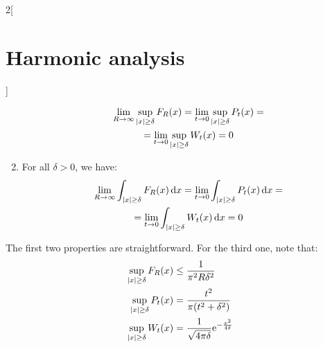 \documentclass[../../../main_math.tex]{subfiles}
\begin{document}
\begin{multicols}{2}[\section{Harmonic analysis}]
\begin{proposition}
\begin{enumerate}
            \begin{multline*}
              \lim_{R\to \infty}\sup_{\abs{x}\geq \delta}F_R(x)=\lim_{t\to 0}\sup_{\abs{x}\geq \delta}P_t(x)=\\=\lim_{t\to 0}\sup_{\abs{x}\geq \delta}W_t(x)=0
            \end{multline*}
            \item\label{HA:propsKernelsitem4} For all $\delta>0$, we have:
            \begin{multline*}
              \lim_{R\to \infty}\int_{\abs{x}\geq \delta}F_R(x)\dd{x}=\lim_{t\to 0}\int_{\abs{x}\geq \delta}P_t(x)\dd{x}=\\=\lim_{t\to 0}\int_{\abs{x}\geq \delta}W_t(x)\dd{x}=0
            \end{multline*}
    \end{enumerate}
  \end{proposition}
  \begin{sproof}
    The first two properties are straightforward. For the third one, note that:
    \begin{align*}
      \sup_{\abs{x}\geq \delta}F_R(x) & \leq \frac{1}{\pi^2 R \delta^2}                        \\
      \sup_{\abs{x}\geq \delta}P_t(x) & =\frac{t^2}{\pi(t^2+\delta^2)}                         \\
      \sup_{\abs{x}\geq \delta}W_t(x) & =\frac{1}{\sqrt{4\pi\delta}}\mathrm{e}^{-\frac{x^2}{4\delta}}
    \end{align*}


\end{sproof}
\end{multicols}
\end{document}
